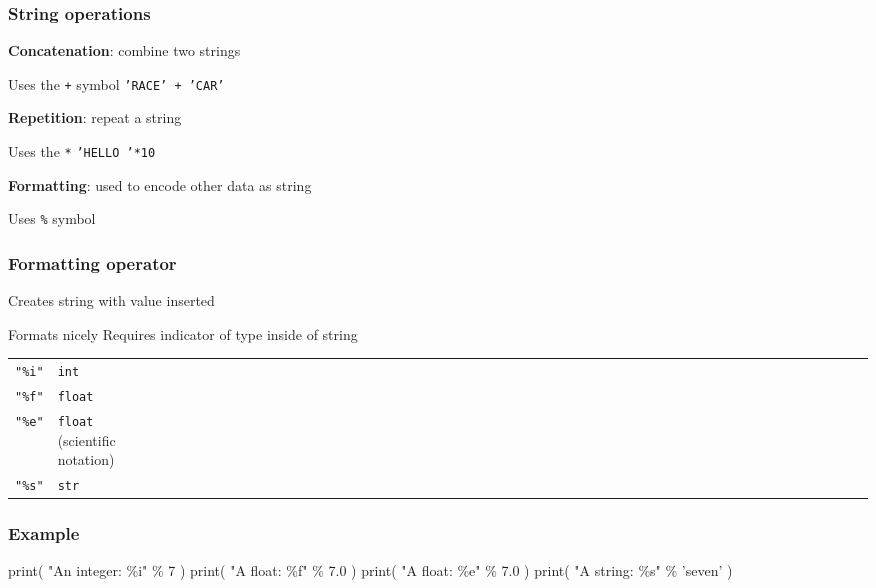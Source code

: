 \documentclass[11pt]{beamer}
\begin{document}
\begin{frame}
  \frametitle{String operations}
  \Enlarge

  \begin{itemize}
  \myitem  \textbf{Concatenation}:  combine two strings
    \begin{itemize}
    \mysubitem  Uses the \texttt{+} symbol
    \mysubitem  \texttt{'RACE' + 'CAR'}
    \end{itemize}
  \myitem  \textbf{Repetition}:  repeat a string
    \begin{itemize}
    \mysubitem  Uses the \texttt{*}
    \mysubitem  \texttt{'HELLO '*10}
    \end{itemize}
  \myitem  \textbf{Formatting}:  used to encode other data as string
    \begin{itemize}
    \mysubitem  Uses \texttt{\%} symbol
    \end{itemize}
  \end{itemize}
\end{frame}

\begin{frame}
  \frametitle{Formatting operator}
  \Enlarge

  \begin{itemize}
  \myitem  Creates string with value inserted
    \begin{itemize}
    \mysubitem  Formats nicely
    \mysubitem  Requires indicator of type inside of string
      \begin{tabular}{*{27}{ll}}
        \texttt{"\%i"} & \texttt{int} \\
        \texttt{"\%f"} & \texttt{float} \\
        \texttt{"\%e"} & \texttt{float} (scientific notation) \\
        \texttt{"\%s"} & \texttt{str}
      \end{tabular}
    \end{itemize}
  \end{itemize}
\end{frame}

\begin{frame}[fragile]
  \frametitle{Example}
  \Enlarge

  \begin{semiverbatim}
print( "An integer:  \%i" \% 7 )
print( "A float:     \%f" \% 7.0 )
print( "A float:     \%e" \% 7.0 )
print( "A string:    \%s" \% 'seven' )
  \end{semiverbatim}
\end{frame}
\end{document}
